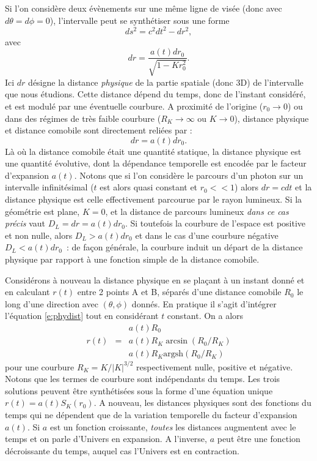 Si l'on considère deux évènements sur une même ligne de visée (donc avec $d\theta=d\phi=0$), l'intervalle peut se synthétiser sous une forme
\begin{equation}
ds^2=c^2dt^2-dr^2,
\end{equation}
avec 
\begin{equation}
dr=\frac{a(t)dr_0}{\sqrt{1-Kr_0^2}}.
\label{e:phydist}
\end{equation}
Ici $dr$ désigne la distance \textit{physique} de la partie spatiale (donc 3D) de l'intervalle que nous étudions. Cette distance dépend du temps, donc de l'instant considéré, et est modulé par une éventuelle courbure. A proximité de l'origine ($r_0\rightarrow 0$) ou dans des régimes de très faible courbure ($R_K\rightarrow\infty$ ou $K\rightarrow 0$), distance physique et distance comobile sont directement reliées par :
\begin{equation}
dr=a(t)dr_0.
\end{equation}
Là où la distance comobile était une quantité statique, la distance physique est une quantité évolutive, dont la dépendance temporelle est encodée par le facteur d'expansion $a(t)$. Notons que si l'on considère le parcours d'un photon sur un intervalle infinitésimal ($t$ est alors quasi constant et $r_0<<1$) alors $dr=cdt$ et la distance physique est celle effectivement parcourue par le rayon lumineux. Si la géométrie est plane, $K=0$, et la distance de parcours lumineux \textit{dans ce cas précis} vaut $D_L=dr=a(t)dr_0$.  Si toutefois la courbure de l'espace est positive et non nulle, alors $ D_L>a(t)dr_0$ et dans le cas d'une courbure négative $ D_L<a(t)dr_0$~: de façon générale, la courbure induit un départ de la distance physique par rapport à une fonction simple de la distance comobile.

Considérons à nouveau la distance physique en se plaçant à un instant donné et en calculant $r(t)$ entre 2 points A et B, séparés d'une distance comobile $R_0$ le long d'une direction avec $(\theta,\phi)$ donnés. En pratique il s'agit d'intégrer l'équation \ref{e:phydist} tout en considérant $t$ constant. On a alors
\begin{eqnarray}
&&a(t)R_0\\
r(t)&=&a(t)R_K \arcsin(R_0/R_K)\\
&&a(t)R_K \mathrm{argsh}(R_0/R_K)
\end{eqnarray}
pour une courbure $R_K=K/|K|^{3/2}$ respectivement nulle, positive et négative. Notons que les termes de courbure sont indépendants du temps. Les trois solutions peuvent être synthétisées sous la forme d'une équation unique $r(t)=a(t)S_K(r_0)$. A nouveau, les distances physiques sont des fonctions du temps qui ne dépendent que de la variation temporelle du facteur d'expansion $a(t)$. Si $a$ est un fonction croissante, \textit{toutes} les distances augmentent avec le temps et on parle d'Univers en expansion. A l'inverse, $a$ peut être une fonction décroissante du temps, auquel cas l'Univers est en contraction.

